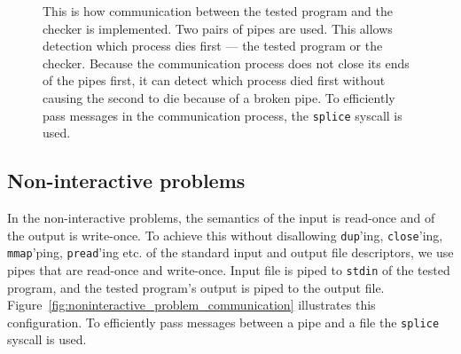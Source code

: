 \documentclass[en]{pracamgr}
\begin{document}
\begin{figure}[h]
\tikzset{>=latex} %
\centering
{}
\caption{This is how communication between the tested program and the checker is implemented. Two pairs of pipes are used. This allows detection which process dies first --- the tested program or the checker. Because the communication process does not close its ends of the pipes first, it can detect which process died first without causing the second to die because of a broken pipe. To efficiently pass messages in the communication process, the \texttt{splice} syscall is used.}
\label{fig:interactive_problem_real_communication}
\end{figure}

\subsection{Non-interactive problems}

In the non-interactive problems, the semantics of the input is read-once and of the output is write-once. To achieve this without disallowing \texttt{dup}'ing, \texttt{close}'ing, \texttt{mmap}'ping, \texttt{pread}'ing etc. of the standard input and output file descriptors, we use pipes that are read-once and write-once. Input file is piped to \texttt{stdin} of the tested program, and the tested program's output is piped to the output file. Figure~\ref{fig:noninteractive_problem_communication} illustrates this configuration. To efficiently pass messages between a pipe and a file the \texttt{splice} syscall is used.
\end{document}
